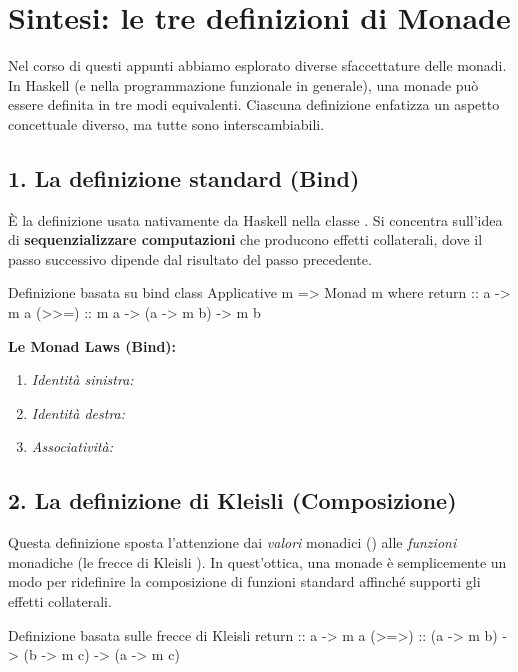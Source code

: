 \section{Sintesi: le tre definizioni di Monade}

Nel corso di questi appunti abbiamo esplorato diverse sfaccettature delle monadi. In Haskell (e nella programmazione funzionale in generale), una monade può essere definita in tre modi equivalenti. Ciascuna definizione enfatizza un aspetto concettuale diverso, ma tutte sono interscambiabili.

\subsection{1. La definizione standard (Bind)}
È la definizione usata nativamente da Haskell nella classe . Si concentra sull'idea di \textbf{sequenzializzare computazioni} che producono effetti collaterali, dove il passo successivo dipende dal risultato del passo precedente.

\begin{haskellbox}{Definizione basata su bind}
class Applicative m => Monad m where
    return :: a -> m a
    (>>=)  :: m a -> (a -> m b) -> m b
\end{haskellbox}

\textbf{Le Monad Laws (Bind):}
\begin{enumerate}
    \item \textit{Identità sinistra:} 
    \item \textit{Identità destra:} 
    \item \textit{Associatività:} 
\end{enumerate}

\subsection{2. La definizione di Kleisli (Composizione)}
Questa definizione sposta l'attenzione dai \textit{valori} monadici () alle \textit{funzioni} monadiche (le frecce di Kleisli ). In quest'ottica, una monade è semplicemente un modo per ridefinire la composizione di funzioni standard  affinché supporti gli effetti collaterali.

\begin{haskellbox}{Definizione basata sulle frecce di Kleisli}
return :: a -> m a
(>=>)  :: (a -> m b) -> (b -> m c) -> (a -> m c)
\end{haskellbox}

